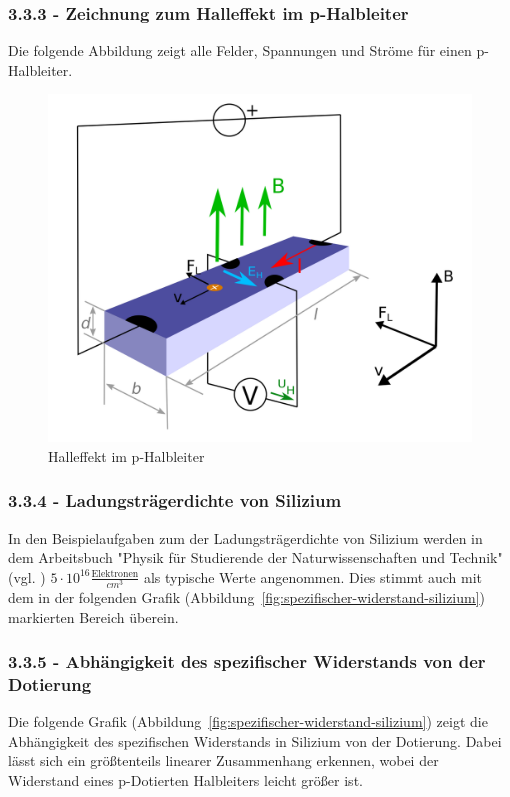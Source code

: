 \documentclass[a4paper]{scrartcl}
\numberwithin{equation}{subsection}
\begin{document}

\subsubsection{3.3.3 - Zeichnung zum Halleffekt im p-Halbleiter}
Die folgende Abbildung zeigt alle Felder, Spannungen und Ströme für einen p-Halbleiter.

\begin{figure}[H]
\includegraphics[width=12cm]{p-Halbleiter_Hall-Effekt}
\centering
\caption{Halleffekt im p-Halbleiter}
\centering
\label{fig:halleffekt-p-halbleiter}
\end{figure}

\subsubsection{3.3.4 - Ladungsträgerdichte von Silizium}
In den Beispielaufgaben zum der Ladungsträgerdichte von Silizium werden in dem Arbeitsbuch "Physik für Studierende der Naturwissenschaften und Technik" (vgl. \cite{tipler}) $5 \cdot 10^{16} \frac{\text{Elektronen}}{cm^3}$ als typische Werte angenommen. Dies stimmt auch mit dem in der folgenden Grafik (Abbildung~\ref{fig:spezifischer-widerstand-silizium}) markierten Bereich überein.

\subsubsection{3.3.5 - Abhängigkeit des spezifischer Widerstands von der Dotierung}
Die folgende Grafik (Abbildung~\ref{fig:spezifischer-widerstand-silizium}) zeigt die Abhängigkeit des spezifischen Widerstands in Silizium von der Dotierung. 
Dabei lässt sich ein größtenteils linearer Zusammenhang erkennen, wobei der Widerstand eines p-Dotierten Halbleiters leicht größer ist.
\end{document}
